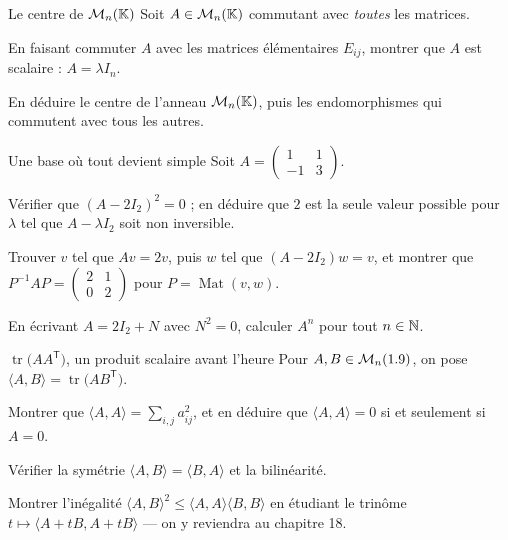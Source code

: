 \begin{exercice}[3]{Le centre de $\mathcal{M}_n(\mathbb{K})$}
Soit $A\in\mathcal{M}_n(\mathbb{K})$ commutant avec \emph{toutes} les matrices.
\begin{questions}
  \item En faisant commuter $A$ avec les matrices élémentaires $E_{ij}$,
    montrer que $A$ est scalaire : $A=\lambda I_n$.
  \item En déduire le centre de l'anneau $\mathcal{M}_n(\mathbb{K})$, puis les
    endomorphismes qui commutent avec tous les autres.
\end{questions}
\end{exercice}

\begin{exercice}[3]{Une base où tout devient simple}
Soit $A=\begin{pmatrix}1&1\\-1&3\end{pmatrix}$.
\begin{questions}
  \item Vérifier que $(A-2I_2)^{2}=0$ ; en déduire que $2$ est la seule
    valeur possible pour $\lambda$ tel que $A-\lambda I_2$ soit non
    inversible.
  \item Trouver $v$ tel que $Av=2v$, puis $w$ tel que $(A-2I_2)w=v$, et
    montrer que $P^{-1}AP=\begin{pmatrix}2&1\\0&2\end{pmatrix}$ pour
    $P=\operatorname{Mat}(v,w)$.
  \item En écrivant $A=2I_2+N$ avec $N^{2}=0$, calculer $A^{n}$ pour tout
    $n\in\mathbb{N}$.
\end{questions}
\end{exercice}

\begin{exercice}[3]{$\operatorname{tr}\bigl(AA^{\mathsf T}\bigr)$, un produit scalaire avant l'heure}
Pour $A,B\in\mathcal{M}_n(1.9)$, on pose
$\langle A,B\rangle=\operatorname{tr}\bigl(AB^{\mathsf T}\bigr)$.
\begin{questions}
  \item Montrer que
    $\langle A,A\rangle=\sum_{i,j}a_{ij}^{2}$, et en déduire que
    $\langle A,A\rangle=0$ si et seulement si $A=0$.
  \item Vérifier la symétrie $\langle A,B\rangle=\langle B,A\rangle$ et la
    bilinéarité.
  \item Montrer l'inégalité
    $\langle A,B\rangle^{2}\leqslant\langle A,A\rangle\langle B,B\rangle$
    en étudiant le trinôme $t\mapsto\langle A+tB,A+tB\rangle$ — on y
    reviendra au chapitre 18.
\end{questions}
\end{exercice}

